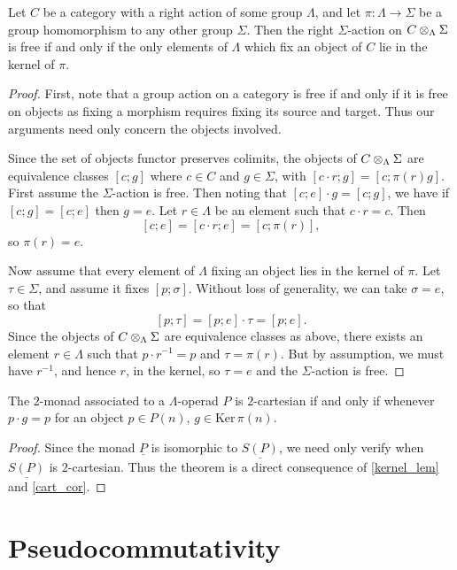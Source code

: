 \begin{lem}\label{kernel_lem}
Let $C$ be a category with a right action of some group $\Lambda$, and let $\pi \colon  \Lambda \rightarrow \Sigma$ be a group homomorphism to any other group $\Sigma$. Then the right $\Sigma$-action on $C \otimes_\Lambda \Sigma$ is free if and only if the only elements of $\Lambda$ which fix an object of $C$ lie in the kernel of $\pi$.
\end{lem}
\begin{proof}
First, note that a group action on a category is free if and only if it is free on objects as fixing a morphism requires fixing its source and target. Thus our arguments need only concern the objects involved.

Since the set of objects functor preserves colimits, the objects of $C \otimes_\Lambda \Sigma$ are equivalence classes $[c;g]$ where $c \in C$ and $g \in \Sigma$, with $[c\cdot r;g] = [c; \pi(r)g]$. First assume the $\Sigma$-action is free. Then noting that $[c;e]\cdot g =[c;g]$, we have if $[c;g] = [c;e]$ then $g=e$. Let $r \in \Lambda$ be an element such that $c\cdot r = c$. Then
  \[
    [c;e] = [c\cdot r; e] = [c; \pi(r)],
  \]
so $\pi(r) = e$.

Now assume that every element of $\Lambda$ fixing an object lies in the kernel of $\pi$. Let $\tau \in \Sigma$, and assume it fixes $[p; \sigma]$. Without loss of generality, we can take $\sigma = e$, so that
  \[
    [p; \tau] = [p;e]\cdot \tau = [p;e].
  \]
Since the objects of $C \otimes_\Lambda \Sigma$ are equivalence classes as above, there exists an element $r \in \Lambda$ such that $p\cdot r^{-1} = p$ and $\tau = \pi(r)$. But by assumption, we must have $r^{-1}$, and hence $r$, in the kernel, so $\tau = e$ and the $\Sigma$-action is free.
\end{proof}

\begin{thm}\label{cart_thm}
The $2$-monad associated to a $\Lambda$-operad $P$ is $2$-cartesian if and only if whenever $p \cdot g = p$ for an object $p \in P(n)$, $g \in \textrm{Ker} \, \pi (n)$.
\end{thm}
\begin{proof}
Since the monad $\underline{P}$ is isomorphic to $\underline{S(P)}$, we need only verify when $\underline{S(P)}$ is $2$-cartesian. Thus the theorem is a direct consequence of \cref{kernel_lem} and \cref{cart_cor}.
\end{proof}



\section{Pseudocommutativity}

